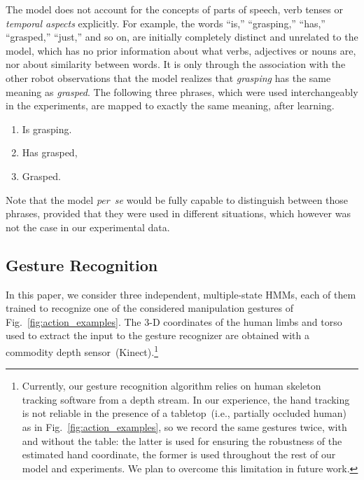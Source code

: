 The \affwords{} model does not account for the concepts of parts of speech, verb tenses or \emph{temporal aspects} explicitly.
For example, the words ``is,'' ``grasping,'' ``has,'' ``grasped,'' ``just,'' and so on, are initially completely distinct and unrelated to the model, which has no prior information about what verbs, adjectives or nouns are, nor about similarity between words.
It is only through the association with the other robot observations that the model realizes that \emph{grasping} has the same meaning as \emph{grasped}.
The following three phrases, which were used interchangeably in the experiments, are mapped to exactly the same meaning, after learning.
\begin{enumerate}
\item Is grasping.

\item Has grasped,

\item Grasped.
\end{enumerate}
Note that the model \emph{per~se} would be fully capable to distinguish between those phrases, provided that they were used in different situations, which however was not the case in our experimental data.

\subsection{Gesture Recognition}
\label{sec:experimental_settings:gesture_recognition}
In this paper, we consider three independent, multiple-state \aclp{HMM}, each of them trained to recognize one of the considered manipulation gestures of  Fig.~\ref{fig:action_examples}.
The 3-D coordinates of the human limbs and torso used to extract the input to the gesture recognizer are obtained with a commodity depth sensor~(Kinect).\footnote{Currently, our gesture recognition algorithm relies on human skeleton tracking software from a depth stream.
In our experience, the hand tracking is not reliable in the presence of a tabletop~(i.e., partially occluded human) as in Fig.~\ref{fig:action_examples}, so we record the same gestures twice, with and without the table: the latter is used for ensuring the robustness of the estimated hand coordinate, the former is used throughout the rest of our model and experiments.
We plan to overcome this limitation in future work.}
